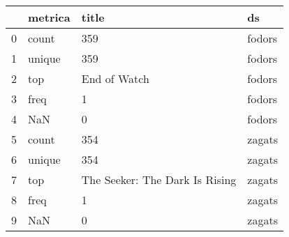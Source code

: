 \begin{tabular}{llll}
\toprule
{} & metrica &                           title &      ds \\
\midrule
0 &   count &                             359 &  fodors \\
1 &  unique &                             359 &  fodors \\
2 &     top &                    End of Watch &  fodors \\
3 &    freq &                               1 &  fodors \\
4 &     NaN &                               0 &  fodors \\
5 &   count &                             354 &  zagats \\
6 &  unique &                             354 &  zagats \\
7 &     top &  The Seeker: The Dark Is Rising &  zagats \\
8 &    freq &                               1 &  zagats \\
9 &     NaN &                               0 &  zagats \\
\bottomrule
\end{tabular}

